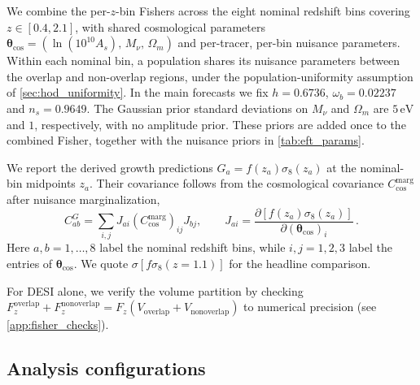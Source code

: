 \documentclass[a4paper,11pt]{article}
\newcommand{\revchange}[1]{{\color{RevisionColor}#1}}
\def\be{\begin{equation}}
\def\ee{\end{equation}}
\newcommand{\Om}{\Omega_m}
\newcommand{\Mnu}{M_\nu}
\begin{document}
\revchange{We combine the per-$z$-bin Fishers across the eight nominal
redshift bins covering $z\in[0.4,2.1]$, with shared
cosmological parameters
$\boldsymbol{\theta}_{\mathrm{cos}}=
(\ln(10^{10}A_s),\,\Mnu,\,\Om)$ and per-tracer, per-bin nuisance parameters. Within each nominal bin, a
population shares its nuisance parameters between the overlap and
non-overlap regions, under the population-uniformity assumption of
\cref{sec:hod_uniformity}. In the main forecasts we fix
$h=0.6736$, $\omega_b=0.02237$ and $n_s=0.9649$.
The Gaussian prior standard deviations on $\Mnu$ and $\Om$
are $5\,\mathrm{eV}$ and $1$, respectively, with no
amplitude prior. These priors are added once to the combined
Fisher, together with the nuisance priors in
\cref{tab:eft_params}.

We report the derived growth predictions $G_a=f(z_a)\sigma_8(z_a)$
at the nominal-bin midpoints $z_a$. Their covariance follows from
the cosmological covariance $C_{\mathrm{cos}}^{\mathrm{marg}}$ after nuisance
marginalization,
\be
\label{eq:fsigma8_cov}
C^{G}_{ab}=\sum_{i,j}J_{ai}
 (C_{\mathrm{cos}}^{\mathrm{marg}})_{ij}J_{bj},
\qquad
J_{ai}=\frac{\partial[f(z_a)\sigma_8(z_a)]}
                 {\partial(\boldsymbol{\theta}_{\mathrm{cos}})_i}\,.
\ee
Here $a,b=1,\ldots,8$ label the nominal redshift bins, while $i,j=1,2,3$
label the entries of $\boldsymbol{\theta}_{\mathrm{cos}}$.
We quote
$\sigma[f\sigma_8(z=1.1)]$ for the headline comparison.}

\revchange{For DESI alone, we verify the volume partition by checking}
$F_z^{\mathrm{overlap}}+F_z^{\mathrm{nonoverlap}}=F_z(V_{\mathrm{overlap}}+V_{\mathrm{nonoverlap}})$ to numerical precision (see \cref{app:fisher_checks}).


\subsection{Analysis configurations}
\label{sec:scenarios}
\end{document}
